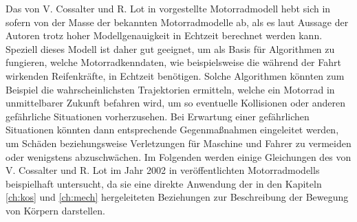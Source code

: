 Das von V. Cossalter und R. Lot in \cite{Cossalter2002} vorgestellte Motorradmodell hebt sich in sofern von der Masse der bekannten Motorradmodelle ab, als es laut Aussage der Autoren trotz hoher Modellgenauigkeit in Echtzeit berechnet werden kann. Speziell dieses Modell ist daher gut geeignet, um als Basis f\"ur Algorithmen zu fungieren, welche Motorradkenndaten, wie beispielsweise die w\"ahrend der Fahrt wirkenden Reifenkr\"afte, in Echtzeit ben\"otigen. Solche Algorithmen k\"onnten zum Beispiel die wahrscheinlichsten Trajektorien ermitteln, welche ein Motorrad in unmittelbarer Zukunft befahren wird, um so eventuelle Kollisionen oder anderen gef\"ahrliche Situationen vorherzusehen. Bei Erwartung einer gef\"ahrlichen Situationen k\"onnten dann entsprechende Gegenma\ss{}nahmen eingeleitet werden, um Sch\"aden beziehungsweise Verletzungen f\"ur Maschine und Fahrer zu vermeiden oder wenigstens abzuschw\"achen. \hfill \newline
Im Folgenden werden einige Gleichungen des von V. Cossalter und R. Lot im Jahr 2002 in \cite{Cossalter2002} ver\"offentlichten Motorradmodells beispielhaft untersucht, da sie eine direkte Anwendung der in den Kapiteln \ref{ch:kos} und \ref{ch:mech} hergeleiteten Beziehungen zur Beschreibung der Bewegung von K\"orpern darstellen. 

